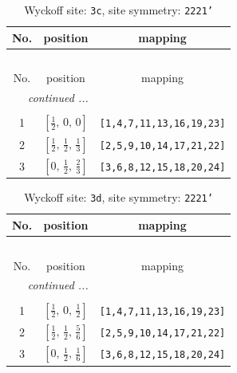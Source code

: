\documentclass[fleqn,8pt]{jsarticle}
\begin{document}
\renewcommand{\arraystretch}{1.2}
\begin{longtable}{ccc}
\caption{Wyckoff site: {\tt 3c}, site symmetry: {\tt 2221'}}
 \\
 \hline \hline
No. & position & mapping \\ \hline \endfirsthead

\multicolumn{2}{l}{\tablename\ \thetable{}} \\
 \hline \hline
No. & position & mapping \\ \hline \endhead

 \hline \hline
\multicolumn{2}{r}{\footnotesize\it continued ...} \\ \endfoot

 \hline \hline
\multicolumn{2}{r}{} \\ \endlastfoot

1 & $\left[ \frac{1}{2},\, 0,\, 0 \right]$ & {\tt [1,4,7,11,13,16,19,23]} \\ \hline
2 & $\left[ \frac{1}{2},\, \frac{1}{2},\, \frac{1}{3} \right]$ & {\tt [2,5,9,10,14,17,21,22]} \\ \hline
3 & $\left[ 0,\, \frac{1}{2},\, \frac{2}{3} \right]$ & {\tt [3,6,8,12,15,18,20,24]} \\
\end{longtable}
\renewcommand{\arraystretch}{1.2}
\begin{longtable}{ccc}
\caption{Wyckoff site: {\tt 3d}, site symmetry: {\tt 2221'}}
 \\
 \hline \hline
No. & position & mapping \\ \hline \endfirsthead

\multicolumn{2}{l}{\tablename\ \thetable{}} \\
 \hline \hline
No. & position & mapping \\ \hline \endhead

 \hline \hline
\multicolumn{2}{r}{\footnotesize\it continued ...} \\ \endfoot

 \hline \hline
\multicolumn{2}{r}{} \\ \endlastfoot

1 & $\left[ \frac{1}{2},\, 0,\, \frac{1}{2} \right]$ & {\tt [1,4,7,11,13,16,19,23]} \\ \hline
2 & $\left[ \frac{1}{2},\, \frac{1}{2},\, \frac{5}{6} \right]$ & {\tt [2,5,9,10,14,17,21,22]} \\ \hline
3 & $\left[ 0,\, \frac{1}{2},\, \frac{1}{6} \right]$ & {\tt [3,6,8,12,15,18,20,24]} \\
\end{longtable}
\end{document}

